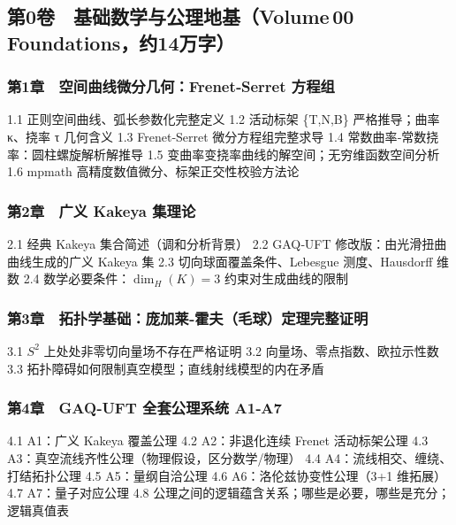 \subsection{第0卷 基础数学与公理地基（Volume\,00
Foundations，约14万字）}\label{ux7b2c0ux5377-ux57faux7840ux6570ux5b66ux4e0eux516cux7406ux5730ux57favolume-00-foundationsux7ea614ux4e07ux5b57}

\subsubsection{第1章 空间曲线微分几何：Frenet‑Serret
方程组}\label{ux7b2c1ux7ae0-ux7a7aux95f4ux66f2ux7ebfux5faeux5206ux51e0ux4f55frenetserret-ux65b9ux7a0bux7ec4}

1.1 正则空间曲线、弧长参数化完整定义 1.2 活动标架 \{T,N,B\}
严格推导；曲率 κ、挠率 τ 几何含义 1.3 Frenet‑Serret 微分方程组完整求导
1.4 常数曲率‑常数挠率：圆柱螺旋解析解推导 1.5
变曲率变挠率曲线的解空间；无穷维函数空间分析 1.6 mpmath
高精度数值微分、标架正交性校验方法论

\subsubsection{第2章 广义 Kakeya
集理论}\label{ux7b2c2ux7ae0-ux5e7fux4e49-kakeya-ux96c6ux7406ux8bba}

2.1 经典 Kakeya 集合简述（调和分析背景） 2.2 GAQ‑UFT
修改版：由光滑扭曲曲线生成的广义 Kakeya 集 2.3
切向球面覆盖条件、Lebesgue 测度、Hausdorff 维数 2.4
数学必要条件：\(\dim_H(K)=3\) 约束对生成曲线的限制

\subsubsection{第3章 拓扑学基础：庞加莱‑霍夫（毛球）定理完整证明}\label{ux7b2c3ux7ae0-ux62d3ux6251ux5b66ux57faux7840ux5e9eux52a0ux83b1ux970dux592bux6bdbux7403ux5b9aux7406ux5b8cux6574ux8bc1ux660e}

3.1 \(S^2\) 上处处非零切向量场不存在严格证明 3.2
向量场、零点指数、欧拉示性数 3.3
拓扑障碍如何限制真空模型；直线射线模型的内在矛盾

\subsubsection{第4章 GAQ‑UFT 全套公理系统
A1‑A7}\label{ux7b2c4ux7ae0-gaquft-ux5168ux5957ux516cux7406ux7cfbux7edf-a1a7}

4.1 A1：广义 Kakeya 覆盖公理 4.2 A2：非退化连续 Frenet 活动标架公理 4.3
A3：真空流线齐性公理（物理假设，区分数学/物理） 4.4
A4：流线相交、缠绕、打结拓扑公理 4.5 A5：量纲自洽公理 4.6
A6：洛伦兹协变性公理（3+1 维拓展） 4.7 A7：量子对应公理 4.8
公理之间的逻辑蕴含关系；哪些是必要，哪些是充分；逻辑真值表

